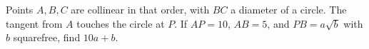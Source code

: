 Points $A,B,C$ are collinear in that order, with $BC$ a diameter of a circle. The tangent from $A$ touches the circle at $P$. If $AP=10$, $AB=5$, and $PB=a\sqrt b$ with $b$ squarefree, find $10a+b$.
